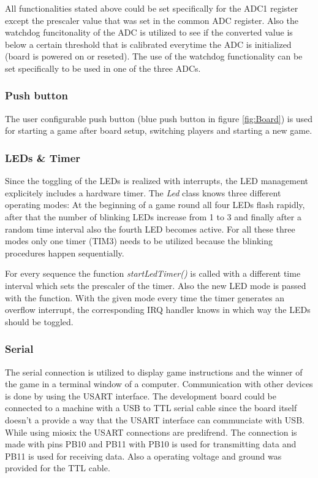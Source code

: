 All functionalities stated above could be set specifically for the ADC1 register except the prescaler value that was set in the common ADC register. Also the watchdog funcitonality of the ADC is utilized to see if the converted value is below a certain threshold that is calibrated everytime the ADC is initialized (board is powered on or reseted). The use of the watchdog functionality can be set specifically to be used in one of the three ADCs.

\subsubsection{Push button}
The user configurable push button (blue push button in figure \ref{fig:Board}) is used for starting a game after board setup, switching players and starting a new game. 


\subsubsection{LEDs \& Timer}
Since the toggling of the LEDs is realized with interrupts, the LED management explicitely includes a hardware timer. The \emph{Led} class knows three different operating modes: At the beginning of a game round all four LEDs flash rapidly, after that the number of blinking LEDs increase from 1 to 3 and finally after a random time interval also the fourth LED becomes active. For all these three modes only one timer (TIM3) needs to be utilized because the blinking procedures happen sequentially.\\
\par
For every sequence the function \emph{startLedTimer()} is called with a different time interval which sets the prescaler of the timer. Also the new LED mode is passed with the function. With the given mode every time the timer generates an overflow interrupt, the corresponding IRQ handler knows in which way the LEDs should be toggled.

\subsubsection{Serial}
The serial connection is utilized to display game instructions and the winner of the game in a terminal window of a computer. Communication with other devices is done by using the USART interface. The development board could be connected to a machine with a USB to TTL serial cable since the board itself doesn't a provide a way that the USART interface can communciate with USB. While using miosix the USART connections are predifrend. The connection is made with pins PB10 and PB11 with PB10 is used for transmitting data and PB11 is used for receiving data. Also a operating voltage and ground was provided for the TTL cable.



